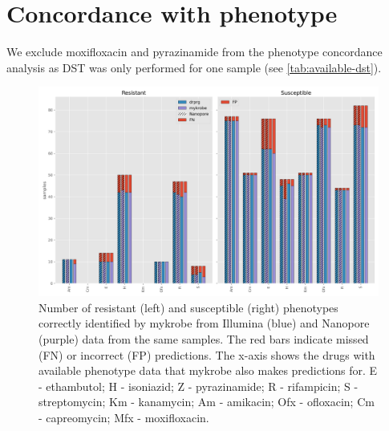 \section{Concordance with phenotype}

We exclude moxifloxacin and pyrazinamide from the phenotype concordance analysis as DST was only performed for one sample (see \autoref{tab:available-dst}).

\begin{figure}
\begin{center}
\includegraphics[width=0.90\columnwidth]{Chapter3/Figs/phenotype_concordance.png}
\caption{{Number of resistant (left) and susceptible (right) phenotypes correctly identified by mykrobe from Illumina (blue) and Nanopore (purple) data from the same samples. The red bars indicate missed (FN) or incorrect (FP) predictions. The x-axis shows the drugs with available phenotype data that mykrobe also makes predictions for. E - ethambutol; H - isoniazid; Z - pyrazinamide; R - rifampicin; S - streptomycin; Km - kanamycin; Am - amikacin; Ofx - ofloxacin; Cm - capreomycin; Mfx - moxifloxacin.
{\label{fig:pheno-concordance}}
}}
\end{center}
\end{figure}

